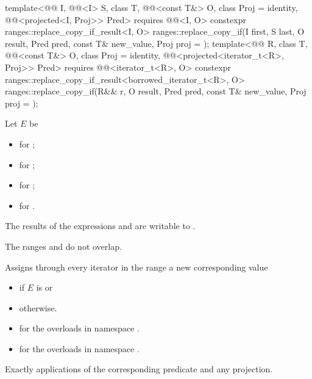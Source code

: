 \begin{itemdecl}
template<@@ I, @@<I> S, class T, @@<const T&> O,
         class Proj = identity, @@<projected<I, Proj>> Pred>
  requires @@<I, O>
  constexpr ranges::replace_copy_if_result<I, O>
    ranges::replace_copy_if(I first, S last, O result, Pred pred, const T& new_value,
                            Proj proj = {});
template<@@ R, class T, @@<const T&> O, class Proj = identity,
         @@<projected<iterator_t<R>, Proj>> Pred>
  requires @@<iterator_t<R>, O>
  constexpr ranges::replace_copy_if_result<borrowed_iterator_t<R>, O>
    ranges::replace_copy_if(R&& r, O result, Pred pred, const T& new_value,
                            Proj proj = {});
\end{itemdecl}

\begin{itemdescr}
\setlength{\emergencystretch}{1.5em}
\pnum
Let $E$ be
\begin{itemize}
\item {}
  for ;
\item {}
  for ;
\item {}
  for ;
\item {}
  for .
\end{itemize}

\pnum
\mandates
The results of the expressions  and 
are writable to .

\pnum
\expects
The ranges  and 
do not overlap.

\pnum
\effects
Assigns through every iterator 
in the range 
a new corresponding value
\begin{itemize}
\item {} if $E$ is  or
\item {} otherwise.
\end{itemize}

\pnum
\returns
\begin{itemize}
\item
  for the overloads in namespace .
\item
  for the overloads in namespace .
\end{itemize}

\pnum
\complexity
Exactly  applications
of the corresponding predicate and any projection.
\end{itemdescr}

